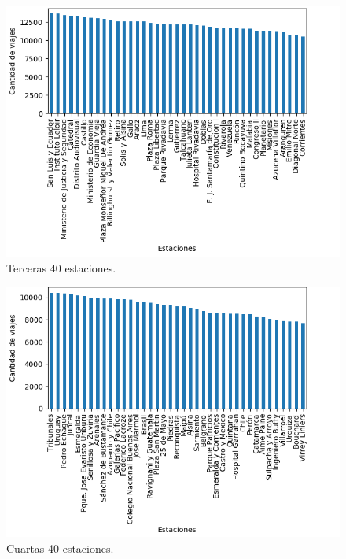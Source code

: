\begin{enumerate}
\begin{itemize}
\begin{figure}[H]
    \centering
    \includegraphics[scale=0.8]{imagenes/nombreDestinoEst3.png}
    \caption{Terceras 40 estaciones.}
 \label{fig: cluster}
\end{figure}

\begin{figure}[H]
    \centering
    \includegraphics[scale=0.8]{imagenes/nombreDestinoEst4.png}
    \caption{Cuartas 40 estaciones.}
 \label{fig: cluster}
\end{figure}


\end{itemize}
\end{enumerate}
